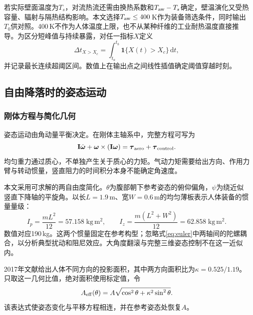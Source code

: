 \documentclass[11pt,a4paper]{article}
\begin{document}
若实际壁面温度为$T_s$，对流热流还需由换热系数和$T_{\rm aw}-T_s$确定，壁温演化又受热容量、辐射与隔热结构影响。本文选择$T_{\rm aw}\le400$\,K作为装备筛选条件，同时输出$T_0$供对照。400\,K不作为人体温度上限，也不从某种纤维的工业耐热温度直接推导。为区分短峰值与持续暴露，对任一指标$X$定义
\begin{equation}
 \Delta t_{X>X_c}=\int_{t_a}^{t_b}\mathbf 1\{X(t)>X_c\}\,\mathrm dt,
 \label{eq:exposure}
\end{equation}
并记录最长连续超阈区间。数值上在输出点之间线性插值确定阈值穿越时刻。

\subsection{自由降落时的姿态运动}
\subsubsection{刚体方程与简化几何}
姿态运动由角动量平衡决定。在刚体主轴系中，完整方程可写为
\begin{equation}
 \mathbf I\dot{\boldsymbol\omega}
 +\boldsymbol\omega\times(\mathbf I\boldsymbol\omega)
 =\boldsymbol\tau_{\rm aero}+\boldsymbol\tau_{\rm control}.
 \label{eq:euler}
\end{equation}
均匀重力通过质心，不单独产生关于质心的力矩。气动力矩需要给出方向、作用力臂与转动惯量，竖直阻力的时间积分本身不能确定角速度。

本文采用可求解的两自由度简化。$\theta$为腹部朝下参考姿态的俯仰偏角，$\psi$为绕近似竖直下降轴的平旋角。以长$L=1.9$\,m、宽$W=0.6$\,m的均匀薄板表示人体装备的惯量量级：
\begin{equation}
 I_p=\frac{mL^2}{12}=57.158\;\mathrm{kg\,m^2},\qquad
 I_z=\frac{m(L^2+W^2)}{12}=62.858\;\mathrm{kg\,m^2}.
 \label{eq:inertia}
\end{equation}
数值对应190\,kg。这两个惯量固定在参考构型；忽略式\eqref{eq:euler}中两轴间的陀螺耦合，以分析典型扰动和阻尼效应。大角度翻滚与完整三维姿态控制不在这一近似内。

2017年文献给出人体不同方向的投影面积，其中两方向面积比为$\kappa=0.525/1.19$\cite{guerster}。只取这一几何比值，绝对面积使用标定值，令
\begin{equation}
 A_{\rm eff}(\theta)=A\sqrt{\cos^2\theta+\kappa^2\sin^2\theta}.
 \label{eq:area}
\end{equation}
该表达式使姿态变化与平移方程相连，并在参考姿态处恢复$A$。
\end{document}
